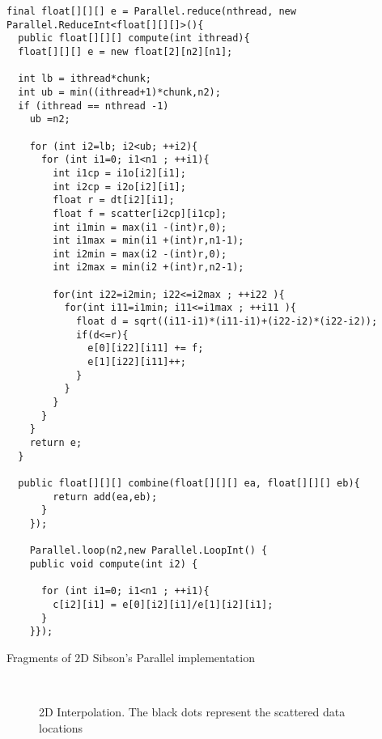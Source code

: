 \documentclass[10pt]{article}
\begin{document}
\begin{program}
\begin{verbatim}
final float[][][] e = Parallel.reduce(nthread, new Parallel.ReduceInt<float[][][]>(){
  public float[][][] compute(int ithread){
  float[][][] e = new float[2][n2][n1];

  int lb = ithread*chunk;
  int ub = min((ithread+1)*chunk,n2);
  if (ithread == nthread -1)
    ub =n2;

    for (int i2=lb; i2<ub; ++i2){ 
      for (int i1=0; i1<n1 ; ++i1){
        int i1cp = i1o[i2][i1];
        int i2cp = i2o[i2][i1];
        float r = dt[i2][i1]; 
        float f = scatter[i2cp][i1cp];
        int i1min = max(i1 -(int)r,0); 
        int i1max = min(i1 +(int)r,n1-1); 
        int i2min = max(i2 -(int)r,0); 
        int i2max = min(i2 +(int)r,n2-1); 

        for(int i22=i2min; i22<=i2max ; ++i22 ){
          for(int i11=i1min; i11<=i1max ; ++i11 ){
            float d = sqrt((i11-i1)*(i11-i1)+(i22-i2)*(i22-i2));
            if(d<=r){
              e[0][i22][i11] += f;      
              e[1][i22][i11]++;
            }
          }
        }
      }
    }
    return e;
  }

  public float[][][] combine(float[][][] ea, float[][][] eb){
        return add(ea,eb);
      }
    });
  
    Parallel.loop(n2,new Parallel.LoopInt() {
    public void compute(int i2) {
    
      for (int i1=0; i1<n1 ; ++i1){
        c[i2][i1] = e[0][i2][i1]/e[1][i2][i1];
      }
    }});
\end{verbatim}
  \caption{Fragments of 2D Sibson's Parallel implementation}
  \label{code:2dSibsonP}
\end{program}    



\begin{figure}
     \begin{center}
%
        \\ %

    \end{center}
    \caption{2D Interpolation. The black dots represent the scattered data locations}
   \label{fig:Int2d}
\end{figure}
\end{document}
